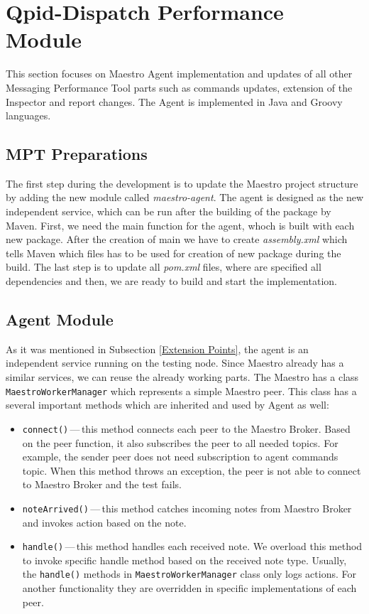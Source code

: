\section{Qpid-Dispatch Performance Module}
This section focuses on Maestro Agent implementation and updates of all other Messaging Performance Tool parts such as commands updates, extension of the Inspector and report changes. The Agent is implemented in Java and Groovy languages.

\subsection{MPT Preparations}
\label{MPT Preparations}
The first step during the development is to update the Maestro project structure by adding the new module called \emph{maestro-agent}. The agent is designed as the new independent service, which can be run after the building of the package by Maven. First, we need the main function for the agent, whoch is built with each new package. After the creation of main we have to create \emph{assembly.xml} which tells Maven which files has to be used for creation of new package during the build. The last step is to update all \emph{pom.xml} files, where are specified all dependencies and then, we are ready to build and start the implementation.

\subsection{Agent Module}
As it was mentioned in Subsection \ref{Extension Points}, the agent is an independent service running on the testing node. Since Maestro already has a similar services, we can reuse the already working parts. The Maestro has a class \texttt{MaestroWorkerManager} which represents a simple Maestro peer. This class has a several important methods which are inherited and used by Agent as well:

\begin{itemize}
	\setlength\itemsep{0em}
	\item \texttt{connect()}\,---\,this method connects each peer to the Maestro Broker. Based on the peer function, it also subscribes the peer to all needed topics. For example, the sender peer does not need subscription to agent commands topic. When this method throws an exception, the peer is not able to connect to Maestro Broker and the test fails.
	\item \texttt{noteArrived()}\,---\,this method catches incoming notes from Maestro Broker and invokes action based on the note.
	\item \texttt{handle()}\,---\,this method handles each received note. We overload this method to invoke specific handle method based on the received note type. Usually, the \texttt{handle()} methods in \texttt{MaestroWorkerManager} class only logs actions. For another functionality they are overridden in specific implementations of each peer.
\end{itemize}

